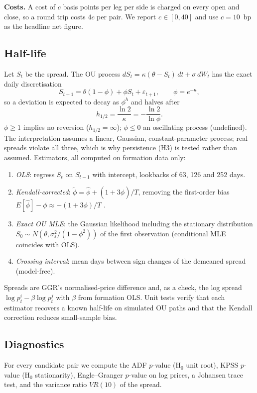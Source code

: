 \documentclass[11pt]{article}
\newcommand{\HL}{h_{1/2}}
\begin{document}
\textbf{Costs.} A cost of $c$ basis points per leg per side is charged on every open and close, so a round trip costs $4c$ per pair. We report $c\in[0,40]$ and use $c=10$~bp as the headline net figure.

\subsection{Half-life}
Let $S_t$ be the spread. The OU process $dS_t=\kappa(\theta-S_t)\,dt+\sigma\,dW_t$ has the exact daily discretisation
\begin{equation}
S_{t+1}=\theta(1-\phi)+\phi S_t+\varepsilon_{t+1},\qquad \phi=e^{-\kappa},
\end{equation}
so a deviation is expected to decay as $\phi^h$ and halves after
\begin{equation}
\HL=\frac{\ln 2}{\kappa}=-\frac{\ln 2}{\ln\phi}.
\end{equation}
$\phi\ge1$ implies no reversion ($\HL=\infty$); $\phi\le0$ an oscillating process (undefined). The interpretation assumes a linear, Gaussian, constant-parameter process; real spreads violate all three, which is why persistence (H3) is tested rather than assumed. Estimators, all computed on formation data only:
\begin{enumerate}
\item \emph{OLS}: regress $S_t$ on $S_{t-1}$ with intercept, lookbacks of 63, 126 and 252 days.
\item \emph{Kendall-corrected}: $\tilde\phi=\hat\phi+(1+3\hat\phi)/T$, removing the first-order bias $E[\hat\phi]-\phi\approx-(1+3\phi)/T$ \citep{kendall1954}.
\item \emph{Exact OU MLE}: the Gaussian likelihood including the stationary distribution $S_0\sim N(\theta,\sigma_\varepsilon^2/(1-\phi^2))$ of the first observation (conditional MLE coincides with OLS).
\item \emph{Crossing interval}: mean days between sign changes of the demeaned spread (model-free).
\end{enumerate}
Spreads are GGR's normalised-price difference and, as a check, the log spread $\log p^i_t-\beta\log p^j_t$ with $\beta$ from formation OLS. Unit tests verify that each estimator recovers a known half-life on simulated OU paths and that the Kendall correction reduces small-sample bias.

\subsection{Diagnostics}
For every candidate pair we compute the ADF $p$-value (H$_0$ unit root), KPSS $p$-value (H$_0$ stationarity), Engle--Granger $p$-value on log prices, a Johansen trace test, and the variance ratio $VR(10)$ of the spread.
\end{document}
